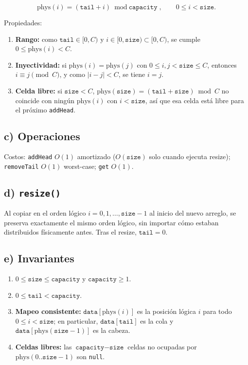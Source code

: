 \documentclass[11pt,a4paper]{article}
\begin{document}
\[
\text{phys}(i) = (\texttt{tail} + i) \bmod \texttt{capacity}, \qquad 0 \le i < \texttt{size}.
\]

Propiedades:
\begin{enumerate}[leftmargin=1.2cm]
    \item \textbf{Rango:} como $\texttt{tail} \in [0, C)$ y $i \in [0, \texttt{size}) \subset [0, C)$, se cumple $0 \le \text{phys}(i) < C$.
    \item \textbf{Inyectividad:} si $\text{phys}(i) = \text{phys}(j)$ con $0 \le i, j < \texttt{size} \le C$, entonces $i \equiv j \pmod{C}$, y como $|i - j| < C$, se tiene $i = j$.
    \item \textbf{Celda libre:} si $\texttt{size} < C$, $\text{phys}(\texttt{size}) = (\texttt{tail} + \texttt{size}) \bmod C$ no coincide con ningún $\text{phys}(i)$ con $i < \texttt{size}$, así que esa celda está libre para el próximo \texttt{addHead}.
\end{enumerate}

\subsection*{c) Operaciones}


Costos: \texttt{addHead} $O(1)$ amortizado ($O(\texttt{size})$ solo cuando ejecuta resize); \texttt{removeTail} $O(1)$ worst-case; \texttt{get} $O(1)$.

\subsection*{d) \texttt{resize()}}
Al copiar en el orden lógico $i = 0, 1, \dots, \texttt{size}-1$ al inicio del nuevo arreglo, se preserva exactamente el mismo orden lógico, sin importar cómo estaban distribuidos físicamente antes. Tras el resize, $\texttt{tail} = 0$.

\subsection*{e) Invariantes}

\begin{enumerate}[label=\textbf{S\arabic*.}, leftmargin=1.2cm]
    \item $0 \le \texttt{size} \le \texttt{capacity}$ y $\texttt{capacity} \ge 1$.
    \item $0 \le \texttt{tail} < \texttt{capacity}$.
    \item \textbf{Mapeo consistente:} $\texttt{data}[\text{phys}(i)]$ es la posición lógica $i$ para todo $0 \le i < \texttt{size}$; en particular, $\texttt{data}[\texttt{tail}]$ es la cola y $\texttt{data}[\text{phys}(\texttt{size}-1)]$ es la cabeza.
    \item \textbf{Celdas libres:} las $\texttt{capacity} - \texttt{size}$ celdas no ocupadas por $\text{phys}(0..\texttt{size}-1)$ son \texttt{null}.
\end{enumerate}
\end{document}
